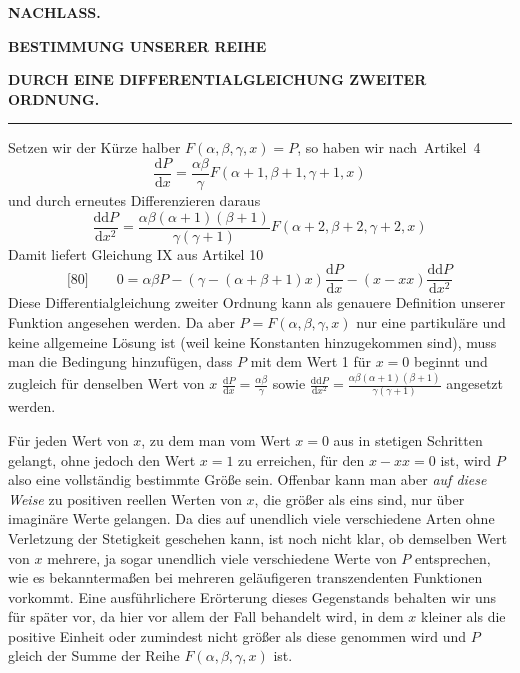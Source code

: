 \clearpage{}
\begin{center}
\textbf{NACHLASS.}\par\medskip
\textbf{BESTIMMUNG UNSERER REIHE}\par\medskip
\textbf{DURCH EINE DIFFERENTIALGLEICHUNG ZWEITER ORDNUNG.}\par\medskip
\rule{0.08\linewidth}{0.3pt}\par\bigskip
\end{center}
Setzen wir der Kürze halber \(F(\alpha,\beta,\gamma,x)=P\), so haben wir \mbox{nach Artikel 4}
\[
\frac{\mathrm{d}P}{\mathrm{d}x}=\frac{\alpha\beta}{\gamma}
F(\alpha+1,\beta+1,\gamma+1,x)
\]
und durch erneutes Differenzieren daraus
\[
\frac{\mathrm{dd}P}{\mathrm{d}x^2}
=\frac{\alpha\beta(\alpha+1)(\beta+1)}{\gamma(\gamma+1)}
F(\alpha+2,\beta+2,\gamma+2,x)
\]
Damit liefert Gleichung IX aus Artikel 10
\[
\text{[80]}\qquad
0=\alpha\beta P-(\gamma-(\alpha+\beta+1)x)
\frac{\mathrm{d}P}{\mathrm{d}x}-(x-xx)\frac{\mathrm{dd}P}{\mathrm{d}x^2}
\]
Diese Differentialgleichung zweiter Ordnung kann als genauere Definition unserer Funktion angesehen werden. Da aber \(P=F(\alpha,\beta,\gamma,x)\) nur eine partikuläre und keine allgemeine Lösung ist (weil keine Konstanten hinzugekommen sind), muss man die Bedingung hinzufügen, dass \(P\) mit dem Wert 1 für \(x=0\) beginnt und zugleich für denselben Wert von \(x\)
\(\frac{\mathrm{d}P}{\mathrm{d}x}=\frac{\alpha\beta}{\gamma}\)
sowie
\(\frac{\mathrm{dd}P}{\mathrm{d}x^2}
=\frac{\alpha\beta(\alpha+1)(\beta+1)}{\gamma(\gamma+1)}\)
angesetzt werden.

Für jeden Wert von \(x\), zu dem man vom Wert \(x=0\) aus in stetigen Schritten gelangt, ohne jedoch den Wert \(x=1\) zu erreichen, für den \(x-xx=0\) ist, wird \(P\) also eine vollständig bestimmte Größe sein. Offenbar kann man aber \emph{auf diese Weise} zu positiven reellen Werten von \(x\), die größer als eins sind, nur über imaginäre Werte gelangen. Da dies auf unendlich viele verschiedene Arten ohne Verletzung der Stetigkeit geschehen kann, ist noch nicht klar, ob demselben Wert von \(x\) mehrere, ja sogar unendlich viele verschiedene Werte von \(P\) entsprechen, wie es bekanntermaßen bei mehreren geläufigeren transzendenten Funktionen vorkommt. Eine ausführlichere Erörterung dieses Gegenstands behalten wir uns für später vor, da hier vor allem der Fall behandelt wird, in dem \(x\) kleiner als die positive Einheit oder zumindest nicht größer als diese genommen wird und \(P\) gleich der Summe der Reihe \(F(\alpha,\beta,\gamma,x)\) ist.

